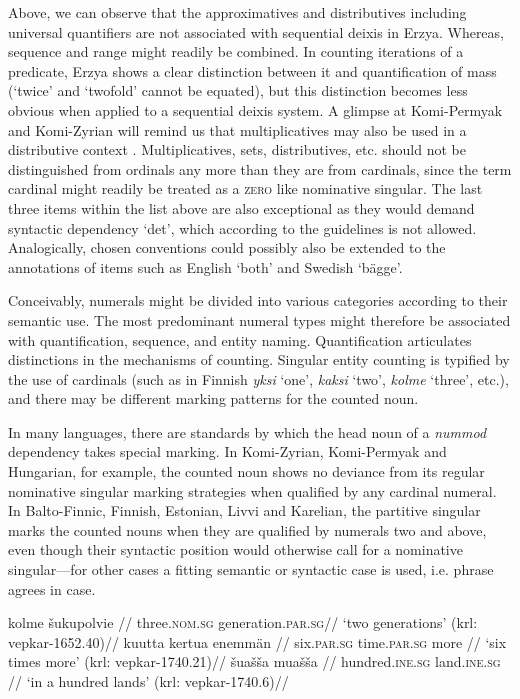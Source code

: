 \documentclass[free]{flammie}
\begin{document}
Above, we can observe that the approximatives and distributives including
universal quantifiers are not associated with sequential deixis in Erzya.
Whereas, sequence and range might readily be combined. In counting iterations of
a predicate, Erzya shows a clear distinction between it and quantification of
mass (`twice' and `twofold' cannot be equated), but this distinction becomes
less obvious when applied to a sequential deixis system. A glimpse at
Komi-Permyak and Komi-Zyrian will remind us that multiplicatives may also be
used in a distributive context \cite[22]{rueter2020questions}. Multiplicatives,
sets, distributives, etc. should not be distinguished from ordinals any more
than they are from cardinals, since the term cardinal might readily be treated
as a \textsc{zero} like nominative singular.  The last three items within the
list above are also exceptional as they would demand syntactic dependency `det',
which according to the guidelines is not allowed. Analogically, chosen
conventions could possibly also be extended to the annotations of items such as
English `both' and Swedish `bägge'.

Conceivably, numerals might be divided into various categories according to
their semantic use. The most predominant numeral types might therefore be
associated with quantification, sequence, and entity naming.  Quantification
articulates distinctions in the mechanisms of counting. Singular entity counting
is typified by the use of cardinals (such as in Finnish \textit{yksi} `one',
\textit{kaksi} `two', \textit{kolme} `three', etc.), and there may be different
marking patterns for the counted noun.

In many languages, there are standards by which the head noun of a
\textit{nummod} dependency takes special marking.  In Komi-Zyrian, Komi-Permyak
and Hungarian, for example, the counted noun shows no deviance from its regular
nominative singular marking strategies when qualified by any cardinal numeral.
In Balto-Finnic, Finnish, Estonian, Livvi and Karelian, the partitive singular
marks the counted nouns when they are qualified by numerals two and above, even
though their syntactic position would otherwise call for a nominative
singular---for other cases a fitting semantic or syntactic case is used, i.e.
phrase agrees in case.

\pex
\a
\begingl
\gla kolme šukupolvie //
\glb three.\textsc{nom.sg} generation.\textsc{par.sg}//
\glft `two generations' (krl: vepkar-1652.40)//
\label{gloss:krl-numcoord1}
\endgl
\a
\begingl
\gla kuutta kertua enemmän //
\glb six.\textsc{par.sg} time.\textsc{par.sg} more //
\glft `six times more' (krl: vepkar-1740.21)//
\label{gloss:krl-numcoord2}
\endgl
\a
\begingl
\gla šuašša muašša //
\glb hundred.\textsc{ine.sg} land.\textsc{ine.sg} //
\glft `in a hundred lands' (krl: vepkar-1740.6)//
\label{gloss:krl-numcoord3}
\endgl
\xe
\end{document}

